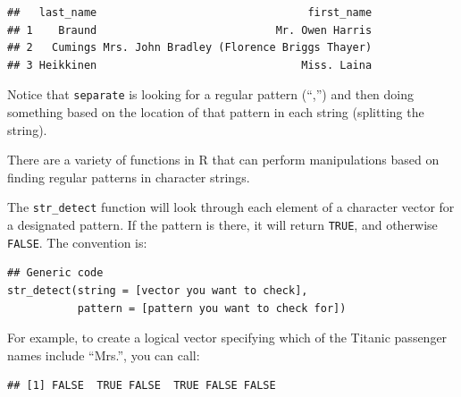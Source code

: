 \documentclass[]{book}
\makeatletter
\newenvironment{Shaded}{\begin{snugshade}}{\end{snugshade}}
\newcommand{\KeywordTok}[1]{\textcolor[rgb]{0.13,0.29,0.53}{\textbf{{#1}}}}
\newcommand{\DataTypeTok}[1]{\textcolor[rgb]{0.13,0.29,0.53}{{#1}}}
\newcommand{\DecValTok}[1]{\textcolor[rgb]{0.00,0.00,0.81}{{#1}}}
\newcommand{\StringTok}[1]{\textcolor[rgb]{0.31,0.60,0.02}{{#1}}}
\newcommand{\NormalTok}[1]{{#1}}
\newenvironment{kframe}{%
\medskip{}
\setlength{\fboxsep}{.8em}
 \def\at@end@of@kframe{}%
 \ifinner\ifhmode%
  \def\at@end@of@kframe{\end{minipage}}%
  \begin{minipage}{\columnwidth}%
 \fi\fi%
 \def\FrameCommand##1{\hskip\@totalleftmargin \hskip-\fboxsep
 \colorbox{shadecolor}{##1}\hskip-\fboxsep
     \hskip-\linewidth \hskip-\@totalleftmargin \hskip\columnwidth}%
 \MakeFramed {\advance\hsize-\width
   \@totalleftmargin\z@ \linewidth\hsize
   \@setminipage}}%
 {\par\unskip\endMakeFramed%
 \at@end@of@kframe}
\renewenvironment{Shaded}{\begin{kframe}}{\end{kframe}}
\makeatother
\begin{document}
\begin{Shaded}
\end{Shaded}

\begin{verbatim}
##   last_name                                 first_name
## 1    Braund                            Mr. Owen Harris
## 2   Cumings Mrs. John Bradley (Florence Briggs Thayer)
## 3 Heikkinen                                Miss. Laina
\end{verbatim}

Notice that \texttt{separate} is looking for a regular pattern (``,'')
and then doing something based on the location of that pattern in each
string (splitting the string). \bigskip

There are a variety of functions in R that can perform manipulations
based on finding regular patterns in character strings.

The \texttt{str\_detect} function will look through each element of a
character vector for a designated pattern. If the pattern is there, it
will return \texttt{TRUE}, and otherwise \texttt{FALSE}. The convention
is:

\begin{verbatim}
## Generic code
str_detect(string = [vector you want to check], 
           pattern = [pattern you want to check for])
\end{verbatim}

For example, to create a logical vector specifying which of the Titanic
passenger names include ``Mrs.'', you can call:

\begin{Shaded}
\end{Shaded}

\begin{verbatim}
## [1] FALSE  TRUE FALSE  TRUE FALSE FALSE
\end{verbatim}
\end{document}
